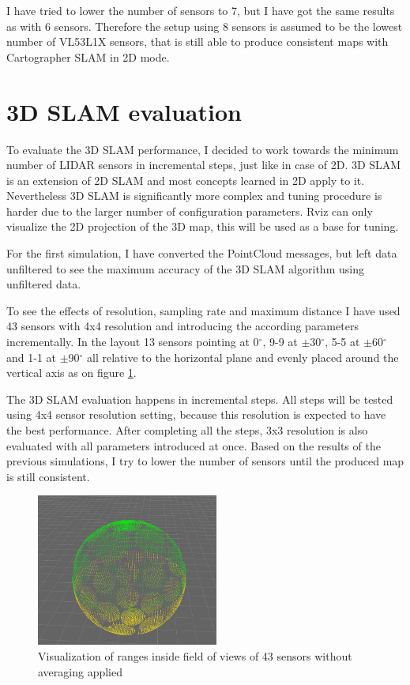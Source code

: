 I have tried to lower the number of sensors to 7, but I have got the same results as with 6 sensors.
Therefore the setup using 8 sensors is assumed to be the lowest number of VL53L1X sensors, that is still 
able to produce consistent maps with Cartographer SLAM in 2D mode.


\newpage

\section{3D SLAM evaluation}
To evaluate the 3D SLAM performance, I decided to work towards the minimum number of LIDAR sensors in
incremental steps, just like in case of 2D. 3D SLAM is an extension of 2D SLAM and most concepts learned
in 2D apply to it. Nevertheless 3D SLAM is significantly more complex and tuning procedure is harder due
to the larger number of configuration parameters. Rviz can only visualize the 2D projection of the 3D
map, this will be used as a base for tuning.

For the first simulation, I have converted the PointCloud messages, but left data unfiltered to see the
maximum accuracy of the 3D SLAM algorithm using unfiltered data. 

To see the effects of resolution, sampling rate and maximum distance I have used 43 sensors with 
4x4 resolution and introducing the according parameters incrementally. In the layout 13 sensors pointing 
at 0$^{\circ}$, 9-9 at $\pm$30$^{\circ}$, 5-5 at $\pm$60$^{\circ}$ and 1-1 at $\pm$90$^{\circ}$ all 
relative to the horizontal plane and evenly placed around the vertical axis as on figure \ref{fig:09_layout}.

The 3D SLAM evaluation happens in incremental steps. All steps will be tested using 4x4 sensor resolution
setting, because this resolution is expected to have the best performance. After completing all the steps,
3x3 resolution is also evaluated with all parameters introduced at once. Based on the results of the previous
simulations, I try to lower the number of sensors until the produced map is still consistent.

\begin{figure}[!h]
    \centering
	\includegraphics[height=50mm, keepaspectratio]{figures/09_layout.png}
    \caption{Visualization of ranges inside field of views of 43 sensors without averaging applied}
    \label{fig:09_layout}
\end{figure}


